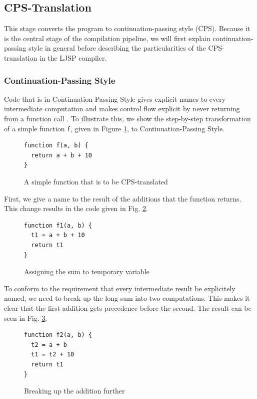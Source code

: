 \documentclass[11pt]{report}
\begin{document}
\subsection{CPS-Translation}
This stage converts the program to continuation-passing style (CPS). Because it is the central stage of the compilation pipeline, we will first explain continuation-passing style in general before describing the particularities of the CPS-translation in the LJSP compiler.

\subsubsection{Continuation-Passing Style}
Code that is in Continuation-Passing Style gives explicit names to every intermediate computation and makes control flow explicit by never returning from a function call \cite{sysftal, appel}. To illustrate this, we show the step-by-step transformation of a simple function \texttt{f}, given in Figure \ref{cpsconvfunc1}, to Continuation-Passing Style.

\begin{figure}[ht]
\begin{lstlisting}
function f(a, b) {
  return a + b + 10
}
\end{lstlisting}
\caption{A simple function that is to be CPS-translated}
\label{cpsconvfunc1}
\end{figure}

First, we give a name to the result of the additions that the function returns. This change results in the code given in Fig. \ref{cpsconvfunc2}.

\begin{figure}[ht]
\begin{lstlisting}
function f1(a, b) {
  t1 = a + b + 10
  return t1
}
\end{lstlisting}
\caption{Assigning the sum to temporary variable}
\label{cpsconvfunc2}
\end{figure}

To conform to the requirement that every intermediate result be explicitely named, we need to break up the long sum into two computations. This makes it clear that the first addition gets precedence before the second. The result can be seen in Fig. \ref{cpsconvfunc3}.

\begin{figure}[ht]
\begin{lstlisting}
function f2(a, b) {
  t2 = a + b
  t1 = t2 + 10
  return t1
}
\end{lstlisting}
\caption{Breaking up the addition further}
\label{cpsconvfunc3}
\end{figure}
\end{document}
